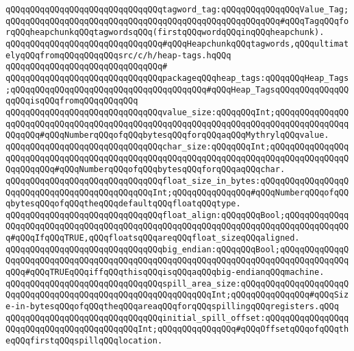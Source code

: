 \verb|qQQqqQQqqQQqqQQqqQQqqQQqqQQqqQQqtagword_tag:qQQqqQQqqQQqqQQqValue_Tag;qQQqqQQqqQQqqQQqqQQqqQQqqQQqqQQqqQQqqQQqqQQqqQQqqQQqqQQq#qQQqTagqQQqforqQQqheapchunkqQQqtagwordsqQQq(firstqQQqwordqQQqinqQQqheapchunk).|\newline
\newline
\verb|qQQqqQQqqQQqqQQqqQQqqQQqqQQqqQQq#qQQqHeapchunkqQQqtagwords,qQQqultimatelyqQQqfromqQQqqQQqqQQqsrc/c/h/heap-tags.hqQQq|\newline
\verb|qQQqqQQqqQQqqQQqqQQqqQQqqQQqqQQq#|\newline
\verb|qQQqqQQqqQQqqQQqqQQqqQQqqQQqqQQqpackageqQQqheap_tags:qQQqqQQqHeap_Tags;qQQqqQQqqQQqqQQqqQQqqQQqqQQqqQQqqQQqqQQq#qQQqHeap_TagsqQQqqQQqqQQqqQQqqQQqisqQQqfromqQQqqQQqqQQq|\newline
\newline
\verb|qQQqqQQqqQQqqQQqqQQqqQQqqQQqqQQqvalue_size:qQQqqQQqInt;qQQqqQQqqQQqqQQqqQQqqQQqqQQqqQQqqQQqqQQqqQQqqQQqqQQqqQQqqQQqqQQqqQQqqQQqqQQqqQQqqQQqqQQqqQQq#qQQqNumberqQQqofqQQqbytesqQQqforqQQqaqQQqMythrylqQQqvalue.|\newline
\verb|qQQqqQQqqQQqqQQqqQQqqQQqqQQqqQQqchar_size:qQQqqQQqInt;qQQqqQQqqQQqqQQqqQQqqQQqqQQqqQQqqQQqqQQqqQQqqQQqqQQqqQQqqQQqqQQqqQQqqQQqqQQqqQQqqQQqqQQqqQQqqQQq#qQQqNumberqQQqofqQQqbytesqQQqforqQQqaqQQqchar.|\newline
\verb|qQQqqQQqqQQqqQQqqQQqqQQqqQQqqQQqfloat_size_in_bytes:qQQqqQQqqQQqqQQqqQQqqQQqqQQqqQQqqQQqqQQqqQQqqQQqInt;qQQqqQQqqQQqqQQq#qQQqNumberqQQqofqQQqbytesqQQqofqQQqtheqQQqdefaultqQQqfloatqQQqtype.|\newline
\verb|qQQqqQQqqQQqqQQqqQQqqQQqqQQqqQQqfloat_align:qQQqqQQqBool;qQQqqQQqqQQqqQQqqQQqqQQqqQQqqQQqqQQqqQQqqQQqqQQqqQQqqQQqqQQqqQQqqQQqqQQqqQQqqQQqqQQq#qQQqIfqQQqTRUE,qQQqfloatsqQQqareqQQqfloat_sizeqQQqaligned.|\newline
\newline
\verb|qQQqqQQqqQQqqQQqqQQqqQQqqQQqqQQqbig_endian:qQQqqQQqBool;qQQqqQQqqQQqqQQqqQQqqQQqqQQqqQQqqQQqqQQqqQQqqQQqqQQqqQQqqQQqqQQqqQQqqQQqqQQqqQQqqQQqqQQq#qQQqTRUEqQQqiffqQQqthisqQQqisqQQqaqQQqbig-endianqQQqmachine.|\newline
\newline
\verb|qQQqqQQqqQQqqQQqqQQqqQQqqQQqqQQqspill_area_size:qQQqqQQqqQQqqQQqqQQqqQQqqQQqqQQqqQQqqQQqqQQqqQQqqQQqqQQqqQQqqQQqInt;qQQqqQQqqQQqqQQq#qQQqSize-in-bytesqQQqofqQQqtheqQQqareaqQQqforqQQqspillingqQQqregisters.qQQq|\newline
\verb|qQQqqQQqqQQqqQQqqQQqqQQqqQQqqQQqinitial_spill_offset:qQQqqQQqqQQqqQQqqQQqqQQqqQQqqQQqqQQqqQQqqQQqInt;qQQqqQQqqQQqqQQq#qQQqOffsetqQQqofqQQqtheqQQqfirstqQQqspillqQQqlocation.|\newline
